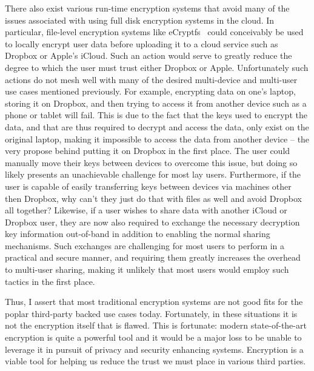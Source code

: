 There also exist various run-time encryption systems that avoid many
of the issues associated with using full disk encryption systems in
the cloud. In particular, file-level encryption systems like
eCryptfs~\cite{ecryptfs} could conceivably be used to locally encrypt
user data before uploading it to a cloud service such as Dropbox or
Apple's iCloud. Such an action would serve to greatly reduce the
degree to which the user must trust either Dropbox or
Apple. Unfortunately such actions do not mesh well with many of the
desired multi-device and multi-user use cases mentioned
previously. For example, encrypting data on one's laptop, storing it
on Dropbox, and then trying to access it from another device such as a
phone or tablet will fail. This is due to the fact that the keys used
to encrypt the data, and that are thus required to decrypt and access
the data, only exist on the original laptop, making it impossible to
access the data from another device -- the very propose behind putting
it on Dropbox in the first place. The user could manually move their
keys between devices to overcome this issue, but doing so likely
presents an unachievable challenge for most lay users. Furthermore, if
the user is capable of easily transferring keys between devices via
machines other then Dropbox, why can't they just do that with files as
well and avoid Dropbox all together? Likewise, if a user wishes to
share data with another iCloud or Dropbox user, they are now also
required to exchange the necessary decryption key information
out-of-band in addition to enabling the normal sharing
mechanisms. Such exchanges are challenging for most users to perform
in a practical and secure manner, and requiring them greatly increases
the overhead to multi-user sharing, making it unlikely that most users
would employ such tactics in the first place.

Thus, I assert that most traditional encryption systems are not good
fits for the poplar third-party backed use cases today. Fortunately,
in these situations it is not the encryption itself that is
flawed. This is fortunate: modern state-of-the-art encryption is quite
a powerful tool and it would be a major loss to be unable to leverage
it in pursuit of privacy and security enhancing systems. Encryption is
a viable tool for helping us reduce the trust we must place in various
third parties.

